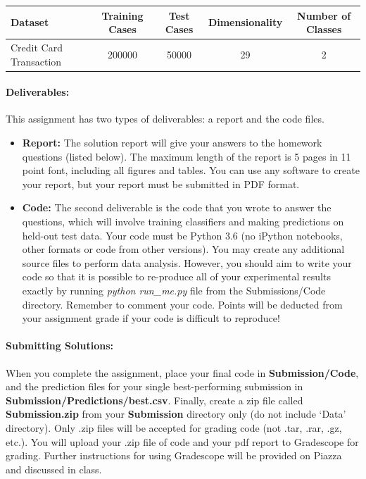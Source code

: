 \documentclass[letterpaper]{article}
\begin{document}
\begin{table}[h!]
\center
\begin{tabular}{|l|c|c|c|c|}\hline
Dataset & Training Cases & Test Cases & Dimensionality & Number of Classes\\\hline
Credit Card Transaction & 200000 & 50000 & 29 & 2\\\hline
\end{tabular}
\end{table}

\paragraph*{Deliverables:} This assignment has two types of deliverables: a report and the code files. 
\begin{itemize}
\item \textbf{Report: } The solution report will give your answers to the homework questions (listed below). The maximum length of the report is 5 pages in 11 point font, including all figures and tables. You can use any software to create your report, but your report must be submitted in PDF format. 

\item \textbf{Code: } The second deliverable is the code that you wrote to answer the questions, which will involve training classifiers and making predictions on held-out test data. Your code must be Python 3.6 (no iPython notebooks, other formats or code from other versions). You may create any additional source files to perform data analysis. However, you should aim to write your code so that it is possible to re-produce all of your experimental results exactly by running \textit{python run\_me.py} file from the Submissions/Code directory. Remember to comment your code. Points will be deducted from your assignment grade if your code is difficult to reproduce!

\end{itemize}

\paragraph*{Submitting Solutions:} When you complete the assignment, place your final code in \textbf{Submission/Code}, and the prediction files for your single best-performing submission in \textbf{Submission/Predictions/best.csv}. Finally, create a zip file called \textbf{Submission.zip} from your \textbf{Submission} directory only (do not include `Data' directory). Only .zip files will be accepted for grading code (not .tar, .rar, .gz, etc.). You will upload your .zip file of code and your pdf report to Gradescope for grading. Further instructions for using Gradescope will be provided on Piazza and discussed in class.
\end{document}
